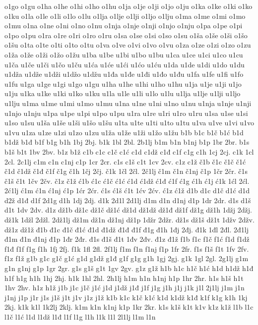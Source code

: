 {o1go
o1gu
o1ha
o1he
o1hi
o1ho
o1hu
o1ja
o1je
o1ji
o1jo
o1ju
o1ka
o1ke
o1ki
o1ko
o1ku
o1la
o1le
o1li
o1lo
o1lu
o1lja
o1lje
o1lji
o1ljo
o1lju
o1ma
o1me
o1mi
o1mo
o1mu
o1na
o1ne
o1ni
o1no
o1nu
o1nja
o1nje
o1nji
o1njo
o1nju
o1pa
o1pe
o1pi
o1po
o1pu
o1ra
o1re
o1ri
o1ro
o1ru
o1sa
o1se
o1si
o1so
o1su
o1ša
o1še
o1ši
o1šo
o1šu
o1ta
o1te
o1ti
o1to
o1tu
o1va
o1ve
o1vi
o1vo
o1vu
o1za
o1ze
o1zi
o1zo
o1zu
o1ža
o1že
o1ži
o1žo
o1žu
u1ba
u1be
u1bi
u1bo
u1bu
u1ca
u1ce
u1ci
u1co
u1cu
u1ča
u1če
u1či
u1čo
u1ču
u1ća
u1će
u1ći
u1ćo
u1ću
u1da
u1de
u1di
u1do
u1du
u1dža
u1dže
u1dži
u1džo
u1džu
u1đa
u1đe
u1đi
u1đo
u1đu
u1fa
u1fe
u1fi
u1fo
u1fu
u1ga
u1ge
u1gi
u1go
u1gu
u1ha
u1he
u1hi
u1ho
u1hu
u1ja
u1je
u1ji
u1jo
u1ju
u1ka
u1ke
u1ki
u1ko
u1ku
u1la
u1le
u1li
u1lo
u1lu
u1lja
u1lje
u1lji
u1ljo
u1lju
u1ma
u1me
u1mi
u1mo
u1mu
u1na
u1ne
u1ni
u1no
u1nu
u1nja
u1nje
u1nji
u1njo
u1nju
u1pa
u1pe
u1pi
u1po
u1pu
u1ra
u1re
u1ri
u1ro
u1ru
u1sa
u1se
u1si
u1so
u1su
u1ša
u1še
u1ši
u1šo
u1šu
u1ta
u1te
u1ti
u1to
u1tu
u1va
u1ve
u1vi
u1vo
u1vu
u1za
u1ze
u1zi
u1zo
u1zu
u1ža
u1že
u1ži
u1žo
u1žu
b1b
b1c
b1č
b1ć
b1d
b1dž
b1đ
b1f
b1g
b1h
1bj
2bj.
b1k
1bl
2bl.
2b1lj
b1m
b1n
b1nj
b1p
1br
2br.
b1s
b1š
b1t
1bv
2bv.
b1z
b1ž
c1b
c1c
c1č
c1ć
c1d
c1dž
c1đ
c1f
c1g
c1h
1cj
2cj.
c1k
1cl
2cl.
2c1lj
c1m
c1n
c1nj
c1p
1cr
2cr.
c1s
c1š
c1t
1cv
2cv.
c1z
c1ž
č1b
č1c
č1č
č1ć
č1d
č1dž
č1đ
č1f
č1g
č1h
1čj
2čj.
č1k
1čl
2čl.
2č1lj
č1m
č1n
č1nj
č1p
1čr
2čr.
č1s
č1š
č1t
1čv
2čv.
č1z
č1ž
ć1b
ć1c
ć1č
ć1ć
ć1d
ć1dž
ć1đ
ć1f
ć1g
ć1h
ć1j
ć1k
1ćl
2ćl.
2ć1lj
ć1m
ć1n
ć1nj
ć1p
1ćr
2ćr.
ć1s
ć1š
ć1t
1ćv
2ćv.
ć1z
ć1ž
d1b
d1c
d1č
d1ć
d1d
d2ž
d1đ
d1f
2d1g
d1h
1dj
2dj.
d1k
2d1l
2d1lj
d1m
d1n
d1nj
d1p
1dr
2dr.
d1s
d1š
d1t
1dv
2dv.
d1z
dž1b
dž1c
dž1č
dž1ć
dž1d
dž1dž
dž1đ
dž1f
dž1g
dž1h
1džj
2džj.
dž1k
1džl
2džl.
2dž1lj
dž1m
dž1n
dž1nj
dž1p
1džr
2džr.
dž1s
dž1š
dž1t
1džv
2džv.
dž1z
dž1ž
đ1b
đ1c
đ1č
đ1ć
đ1d
đ1dž
đ1đ
đ1f
đ1g
đ1h
1đj
2đj.
đ1k
1đl
2đl.
2đ1lj
đ1m
đ1n
đ1nj
đ1p
1đr
2đr.
đ1s
đ1š
đ1t
1đv
2đv.
đ1z
đ1ž
f1b
f1c
f1č
f1ć
f1d
f1dž
f1đ
f1f
f1g
f1h
1fj
2fj.
f1k
1fl
2fl.
2f1lj
f1m
f1n
f1nj
f1p
1fr
2fr.
f1s
f1š
f1t
1fv
2fv.
f1z
f1ž
g1b
g1c
g1č
g1ć
g1d
g1dž
g1đ
g1f
g1g
g1h
1gj
2gj.
g1k
1gl
2gl.
2g1lj
g1m
g1n
g1nj
g1p
1gr
2gr.
g1s
g1š
g1t
1gv
2gv.
g1z
g1ž
h1b
h1c
h1č
h1ć
h1d
h1dž
h1đ
h1f
h1g
h1h
1hj
2hj.
h1k
1hl
2hl.
2h1lj
h1m
h1n
h1nj
h1p
1hr
2hr.
h1s
h1š
h1t
1hv
2hv.
h1z
h1ž
j1b
j1c
j1č
j1ć
j1d
j1dž
j1đ
j1f
j1g
j1h
j1j
j1k
j1l
2j1lj
j1m
j1n
j1nj
j1p
j1r
j1s
j1š
j1t
j1v
j1z
j1ž
k1b
k1c
k1č
k1ć
k1d
k1dž
k1đ
k1f
k1g
k1h
1kj
2kj.
k1k
k1l
1k2lj
2klj.
k1m
k1n
k1nj
k1p
1kr
2kr.
k1s
k1š
k1t
k1v
k1z
k1ž
l1b
l1c
l1č
l1ć
l1d
l1dž
l1đ
l1f
l1g
l1h
l1k
l1l
2l1lj
l1m
l1n
}
